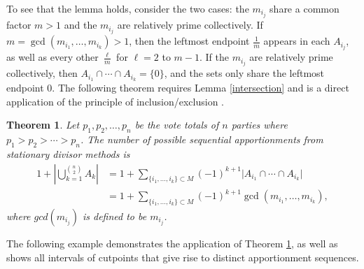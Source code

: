 \documentclass[pdflatex,sn-mathphys-num]{sn-jnl}
\theoremstyle{thmstyleone}%
\newtheorem{theorem}{Theorem}%
\theoremstyle{thmstyletwo}%
\theoremstyle{thmstylethree}%
\begin{document}
To see that the lemma holds, consider the two cases: the $m_{i_j}$ share a common factor $m>1$ and the $m_{i_j}$ are relatively prime collectively.  If $m= \gcd(m_{i_1}, \ldots, m_{i_k}) > 1$, then the leftmost endpoint $\frac{1}{m}$ appears in each $A_{i_j}$, as well as every other $\frac{\ell}{m}$  for $\ell = 2$ to $m-1$. If the $m_{i_j}$ are relatively prime collectively, then $A_{i_1} \cap  \cdots \cap A_{i_k}  = \{0\}$, and the sets only share the leftmost endpoint $0$. The following theorem requires Lemma \ref{intersection} and is a direct application of the principle of inclusion/exclusion \cite[p.165]{Br}.


 
  \begin{theorem} \label{counting}
Let $p_1, p_2, \dots, p_n$ be the vote totals of $n$ parties where $p_1>p_2 > \cdots > p_n$.  The number of possible sequential apportionments from stationary divisor methods is
\begin{align*}
1+\left\vert \bigcup_{k=1}^{\binom{n}{2}}  A_k \right\vert  &=1+  \sum_{\{i_1, \ldots, i_k\} \subset M}  (-1)^{k+1} \vert A_{i_1} \cap \cdots \cap A_{i_k} \vert  \\
&=1+  \sum_{\{i_1, \ldots, i_k\} \subset M}  (-1)^{k+1}  \gcd(m_{i_1}, \ldots, m_{i_k}),
\end{align*}
where $gcd(m_{i_j})$ is defined to be $m_{i_j}$.
\end{theorem}
 


The following example demonstrates the application of Theorem \ref{counting}, as well as shows all intervals of cutpoints that give rise to distinct apportionment sequences.
\end{document}
